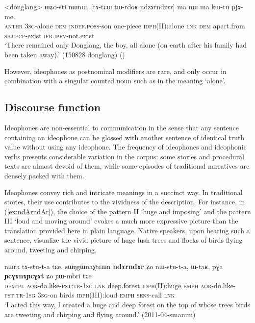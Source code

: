\begin{exe}
\ex \label{ex:ndzArndzAr.ma}
\gll  <donglang> ɯʑo-sti nɯnɯ, [tɤ-tɕɯ tɯ-rdoʁ ndzɤrndzɤr] ma nɯ ma kɯ-tu pjɤ-me. \\
\textsc{anthr} \textsc{3sg}-alone \textsc{dem} \textsc{indef}.\textsc{poss}-son one-piece \textsc{idph}(II):alone \textsc{lnk} \textsc{dem} apart.from \textsc{sbj}:\textsc{pcp}-exist \textsc{ifr}.\textsc{ipfv}-not.exist \\
\glt `There remained only Donglang, the boy, all alone (on earth after his family had been taken away).' (150828 donglang)
()
\end{exe}

However, ideophones as postnominal modifiers are rare, and only occur in combination with a singular counted noun such as  in the meaning `alone'. 

\subsection{Discourse function}
 Ideophones are non-essential to communication in the sense that any sentence containing an ideophone can be glossed with another sentence of identical truth value without using any ideophone. The frequency of ideophones and ideophonic verbs presents considerable variation  in the corpus: some stories and procedural texts are almost devoid of them, while some episodes of traditional narratives are densely packed with them.
  
Ideophones convey rich and intricate meanings in a succinct way. In traditional stories, their use contributes to the vividness of the description. For instance, in  (\ref{ex:ndArndAr}), the choice of the pattern II  `huge and imposing'	and 	the pattern III  `loud and moving around' evokes  a much more expressive picture than the  translation provided here in plain language. Native speakers, upon hearing such a sentence, visualize the vivid picture of huge lush trees and flocks of birds flying around, tweeting and chirping.

\begin{exe}
\ex \label{ex:ndArndAr}
 \gll nɯra tɤ-stu-t-a tɕe,  sɯŋgɯnaχtɕɯn \textbf{ndɤrndɤr} ʑo nɯ-stu-t-a, ɯ-taʁ,  pɣa \textbf{ɲcɣɤnɤɲcɣɤt} ʑo ɲɯ-mbri tɕe \\
\textsc{dem}:\textsc{pl} \textsc{aor}-do.like-\textsc{pst}:\textsc{tr}-\textsc{1sg} \textsc{lnk} deep.forest \textsc{idph}(II):huge \textsc{emph} \textsc{aor}-do.like-\textsc{pst}:\textsc{tr}-\textsc{1sg} \textsc{3sg}-on birds \textsc{idph}(III):loud \textsc{emph} \textsc{sens}-call \textsc{lnk} \\
\glt `I acted this way, I created a huge and deep forest on the top of whose trees birds are tweeting and chirping and flying around.' (2011-04-smanmi)
\end{exe}


